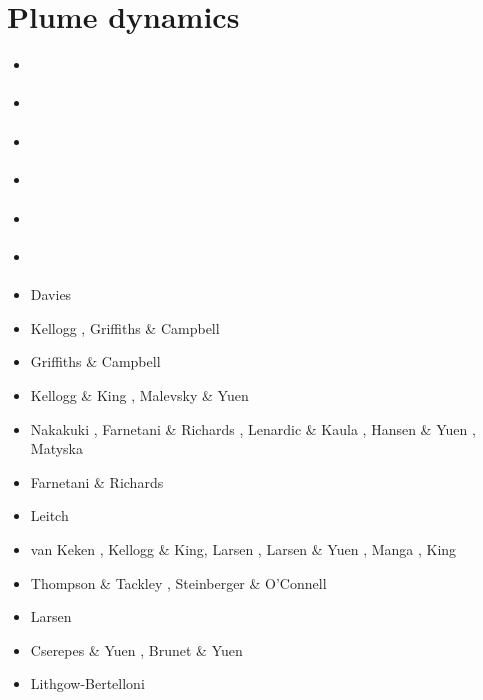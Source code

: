 \section{Plume dynamics}

\begin{scriptsize}
\begin{itemize}
\item[\nineteenseventyone] 
\textcite{morg71} 
\item[\nineteenseventythree] 
\textcite{toze73} 
\item[\nineteenseventyfive] 
\textcite{patt75} 
\item[\nineteenseventyseven] 
\textcite{hovo77}
\item[\nineteeneighty] 
\textcite{yupe80} 
\item[\nineteeneightyseven] 
\textcite{zhyu87} 
\textcite{rism87} 
\item[\nineteenninety] Davies \cite{davi90}
\item[\nineteenninetyone] Kellogg \cite{kell91}, Griffiths \& Campbell \cite{grca91b}
\item[\nineteenninety] Griffiths \& Campbell \cite{grca90}
\item[\nineteenninetythree] Kellogg \& King \cite{keki93}, Malevsky \& Yuen \cite{mayu93}
\item[\nineteenninetyfour] Nakakuki \etal \cite{nasf94}, Farnetani \& Richards \cite{fari94},
                           Lenardic \& Kaula \cite{leka94b}, Hansen \& Yuen \cite{hayu94},
                           Matyska \etal \cite{mamy94}
\item[\nineteenninetyfive] Farnetani \& Richards \cite{fari95}
\item[\nineteenninetysix] Leitch \etal \cite{lesy96} 
\item[\nineteenninetyseven] van Keken \cite{vank97}, Kellogg \& King\cite{keki97},
                            Larsen \etal \cite{laym97}, Larsen \& Yuen \cite{layu97,layu97b},
                            Manga \cite{mang97}, King \cite{king97} 
\item[\nineteenninetyeight] Thompson \& Tackley \cite{thta98}, Steinberger \& O'Connell \cite{stoc98}
\item[\nineteenninetynine] Larsen \etal \cite{lays99}
\item[\twothousand] Cserepes \& Yuen \cite{csyu00}, Brunet \& Yuen \cite{bryu00}
\item[\twothousandone] Lithgow-Bertelloni \cite{lirc01}

\end{itemize}
\end{scriptsize}
